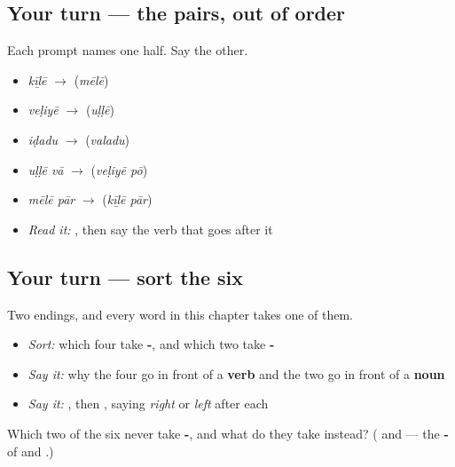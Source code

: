 \subsection*{Your turn — the pairs, out of order}
Each prompt names one half. Say the other.

\begin{itemize}
\raggedright
  \item \emph{kīḻē} $\to$ (\emph{mēlē})
  \item \emph{veḷiyē} $\to$ (\emph{uḷḷē})
  \item \emph{iḍadu} $\to$ (\emph{valadu})
  \item \emph{uḷḷē vā} $\to$ (\emph{veḷiyē pō})
  \item \emph{mēlē pār} $\to$ (\emph{kīḻē pār})
  \item \emph{Read it:} \textbf{}, then say the verb that goes after it
\end{itemize}

\subsection*{Your turn — sort the six}
Two endings, and every word in this chapter takes one of them.

\begin{itemize}
\raggedright
  \item \emph{Sort:} which four take \textbf{-}, and which two take \textbf{-}
  \item \emph{Say it:} why the four go in front of a \textbf{verb} and the two go in front of a \textbf{noun}
  \item \emph{Say it:} \textbf{ }, then \textbf{ }, saying \emph{right} or \emph{left} after each
\end{itemize}

\begin{tcolorbox}[breakable,colback=teal!4,colframe=teal!35!black,title={Before you move on}]
Which two of the six never take \textbf{-}, and what do they take instead? (\textbf{} and \textbf{} — the \textbf{-} of \textbf{} and \textbf{}.)
\end{tcolorbox}
